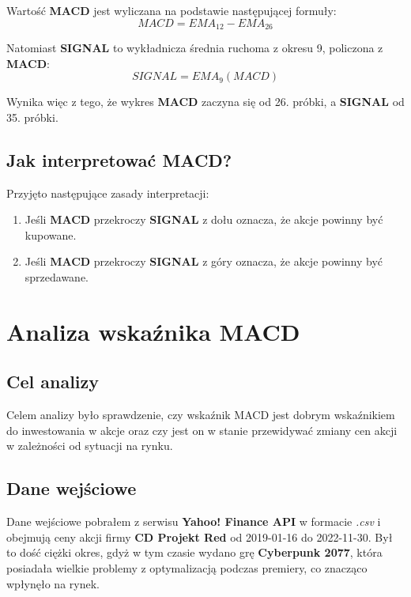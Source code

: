 \documentclass{article}
\begin{document}
    Wartość \textbf{MACD} jest wyliczana na podstawie następującej formuły:
    \begin{equation}
        MACD = EMA_{12} - EMA_{26}
    \end{equation}

    Natomiast \textbf{SIGNAL} to wykładnicza średnia ruchoma z okresu 9, policzona z \textbf{MACD}:
    \begin{equation}
        SIGNAL = EMA_{9}(MACD)
    \end{equation}

    Wynika więc z tego, że wykres \textbf{MACD} zaczyna się od 26. próbki, a \textbf{SIGNAL} od 35. próbki.

    \subsection{Jak interpretować MACD?}

    Przyjęto następujące zasady interpretacji:
    \begin{enumerate}
        \item Jeśli \textbf{MACD} przekroczy \textbf{SIGNAL} z dołu oznacza, że akcje powinny być kupowane.
        \item Jeśli \textbf{MACD} przekroczy \textbf{SIGNAL} z góry oznacza, że akcje powinny być sprzedawane.
    \end{enumerate}

    \section{Analiza wskaźnika MACD}
    \subsection{Cel analizy}

    Celem analizy było sprawdzenie, czy wskaźnik MACD jest dobrym wskaźnikiem do inwestowania w akcje
    oraz czy jest on w stanie przewidywać zmiany cen akcji w zależności od sytuacji na rynku.
    \subsection{Dane wejściowe}

    Dane wejściowe pobrałem z serwisu \textbf{Yahoo! Finance API} \cite{api} w formacie \textit{.csv} i obejmują
    ceny akcji firmy \textbf{CD Projekt Red} od 2019-01-16 do 2022-11-30.
    Był to dość ciężki okres, gdyż w tym czasie wydano grę
    \textbf{Cyberpunk 2077}, która posiadała wielkie problemy z optymalizacją podczas premiery,
    co znacząco wpłynęło na rynek.
\end{document}
